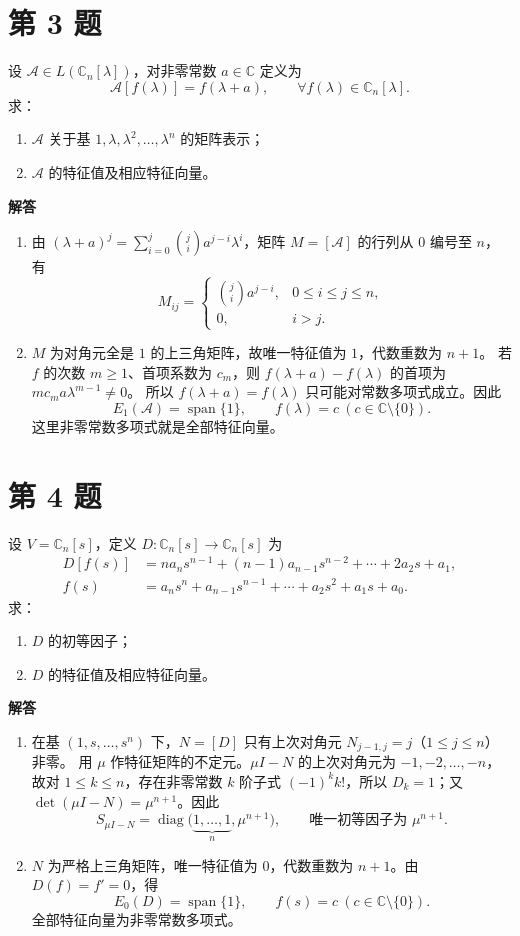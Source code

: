 \documentclass[UTF8,10pt,letterpaper,fontset=fandol]{ctexart}
\newcommand{\C}{\mathbb C}
\newcommand{\Solution}{\par\Needspace{4\baselineskip}\textbf{解答}\par}
\begin{document}
\newpage
\section{第 3 题}
设 $\mathcal A\in L(\C_n[\lambda])$，对非零常数 $a\in\C$ 定义为
\[
\mathcal A[f(\lambda)]=f(\lambda+a),\qquad\forall f(\lambda)\in\C_n[\lambda].
\]
求：
\begin{enumerate}
\item $\mathcal A$ 关于基 $1,\lambda,\lambda^2,\ldots,\lambda^n$ 的矩阵表示；
\item $\mathcal A$ 的特征值及相应特征向量。
\end{enumerate}
\Solution
\begin{enumerate}
\item 由 $(\lambda+a)^j=\sum_{i=0}^j\binom ji a^{j-i}\lambda^i$，矩阵 $M=[\mathcal A]$ 的行列从 $0$ 编号至 $n$，有
\[
\boxed{M_{ij}=\begin{cases}\binom ji a^{j-i},&0\le i\le j\le n,\\0,&i>j.\end{cases}}
\]
\item $M$ 为对角元全是 $1$ 的上三角矩阵，故唯一特征值为 $1$，代数重数为 $n+1$。
若 $f$ 的次数 $m\ge1$、首项系数为 $c_m$，则 $f(\lambda+a)-f(\lambda)$ 的首项为 $mc_ma\lambda^{m-1}\ne0$。
所以 $f(\lambda+a)=f(\lambda)$ 只可能对常数多项式成立。因此
\[
\boxed{E_1(\mathcal A)=\operatorname{span}\{1\},\qquad f(\lambda)=c\ (c\in\C\setminus\{0\})}.
\]
这里非零常数多项式就是全部特征向量。
\end{enumerate}

\section{第 4 题}
设 $V=\C_n[s]$，定义 $D:\C_n[s]\to\C_n[s]$ 为
\[
\begin{aligned}
D[f(s)]&=na_ns^{n-1}+(n-1)a_{n-1}s^{n-2}+\cdots+2a_2s+a_1,\\
f(s)&=a_ns^n+a_{n-1}s^{n-1}+\cdots+a_2s^2+a_1s+a_0.
\end{aligned}
\]
求：
\begin{enumerate}
\item $D$ 的初等因子；
\item $D$ 的特征值及相应特征向量。
\end{enumerate}
\Solution
\begin{enumerate}
\item 在基 $(1,s,\ldots,s^n)$ 下，$N=[D]$ 只有上次对角元 $N_{j-1,j}=j$（$1\le j\le n$）非零。
用 $\mu$ 作特征矩阵的不定元。$\mu I-N$ 的上次对角元为 $-1,-2,\ldots,-n$，故对 $1\le k\le n$，存在非零常数 $k$ 阶子式 $(-1)^k k!$，所以 $D_k=1$；又 $\det(\mu I-N)=\mu^{n+1}$。因此
\[
S_{\mu I-N}=\operatorname{diag}\bigl(\underbrace{1,\ldots,1}_{n},\mu^{n+1}\bigr),
\qquad\boxed{\text{唯一初等因子为 }\mu^{n+1}}.
\]
\item $N$ 为严格上三角矩阵，唯一特征值为 $0$，代数重数为 $n+1$。由 $D(f)=f'=0$，得
\[
\boxed{E_0(D)=\operatorname{span}\{1\},\qquad f(s)=c\ (c\in\C\setminus\{0\})}.
\]
全部特征向量为非零常数多项式。
\end{enumerate}
\end{document}
